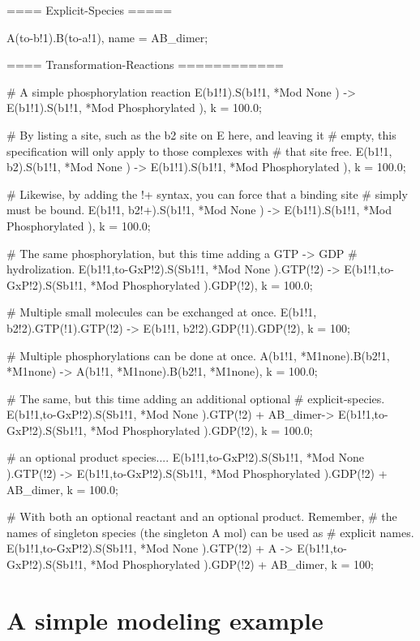 \begin{ExampleMZR}

==== Explicit-Species =====

A(to-b!1).B(to-a!1), name = AB_dimer;


==== Transformation-Reactions ============

# A simple phosphorylation reaction
E(b1!1).S(b1!1, *Mod{ None }) -> E(b1!1).S(b1!1, *Mod{ Phosphorylated }),
     k = 100.0;

# By listing a site, such as the b2 site on E here, and leaving it
# empty, this specification will only apply to those complexes with
# that site free.
E(b1!1, b2).S(b1!1, *Mod{ None }) -> E(b1!1).S(b1!1, *Mod{ Phosphorylated }),
     k = 100.0;

# Likewise, by adding the !+ syntax, you can force that a binding site
# simply must be bound.
E(b1!1, b2!+).S(b1!1, *Mod{ None }) -> E(b1!1).S(b1!1, *Mod{ Phosphorylated }),
     k = 100.0;

# The same phosphorylation, but this time adding a GTP -> GDP
# hydrolization.  
E(b1!1,to-GxP!2).S(Sb1!1, *Mod{ None }).GTP(!2) ->
  E(b1!1,to-GxP!2).S(Sb1!1, *Mod{ Phosphorylated }).GDP(!2),
    k = 100.0;

# Multiple small molecules can be exchanged at once.
E(b1!1, b2!2).GTP(!1).GTP(!2) -> E(b1!1, b2!2).GDP(!1).GDP(!2), k = 100;

# Multiple phosphorylations can be done at once.  
A(b1!1, *M1{none}).B(b2!1, *M1{none}) -> A(b1!1, *M1{none}).B(b2!1, *M1{none}),
   k = 100.0;

# The same, but this time adding an additional optional
# explicit-species. 
E(b1!1,to-GxP!2).S(Sb1!1, *Mod{ None }).GTP(!2) + AB\_dimer->
  E(b1!1,to-GxP!2).S(Sb1!1, *Mod{ Phosphorylated }).GDP(!2),
   k = 100.0;

# an optional product species....
E(b1!1,to-GxP!2).S(Sb1!1, *Mod{ None }).GTP(!2) ->
  E(b1!1,to-GxP!2).S(Sb1!1, *Mod{ Phosphorylated }).GDP(!2)  + AB\_dimer,
    k = 100.0;

# With both an optional reactant and an optional product.  Remember,
# the names of singleton species (the singleton A mol) can be used as
# explicit names.  
E(b1!1,to-GxP!2).S(Sb1!1, *Mod{ None }).GTP(!2) + A ->
  E(b1!1,to-GxP!2).S(Sb1!1, *Mod{ Phosphorylated }).GDP(!2)  + AB\_dimer,
    k = 100;
\end{ExampleMZR}

\section{A simple modeling example}

